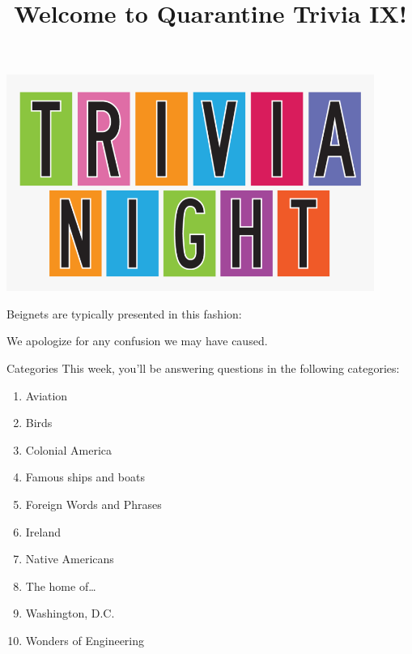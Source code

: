\documentclass[11pt]{beamer}
\begin{document}
\title{Welcome to Quarantine Trivia IX!\vspace{-0.5in}}
\date{}

\begin{frame}
    \titlepage{}
    \begin{center}
        \includegraphics[max width=0.9\textwidth,
            max height=0.4\textheight]{Images/triviatitleframelogo.png}
    \end{center}
\end{frame}

\begingroup{}
\begin{frame}[t]{}

    \medskip{}

    Beignets are typically presented in this fashion:
    \pause{}
\end{frame}
\begin{frame}[t]{}
    \pause{}
    We apologize for any confusion we may have caused.
\end{frame}
\endgroup{}

\begingroup{}
\begin{frame}[t]{Categories}
    This week, you'll be answering questions in the following categories:
    \begin{enumerate}
        \item Aviation
        \item Birds
        \item Colonial America
        \item Famous ships and boats
        \item Foreign Words and Phrases
        \item Ireland
        \item Native Americans
        \item The home of\ldots{}
        \item Washington, D.C.
        \item Wonders of Engineering
    \end{enumerate}
\end{frame}
\endgroup{}
\end{document}
